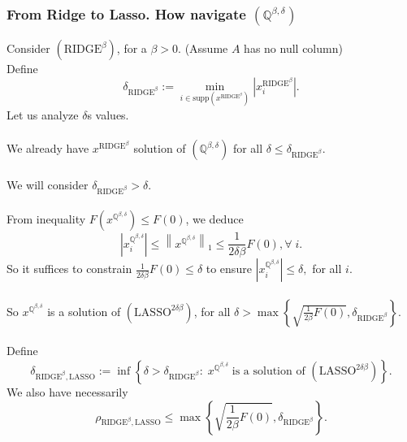 \documentclass[fleqn]{report} %
\newcommand\ddfrac[2]{\frac{\displaystyle #1}{\displaystyle #2}}
\begin{document}
\subsubsection{From Ridge to Lasso. How navigate $(\mathbb{Q}^{\beta,\delta})$}
Consider $(\text{RIDGE}^{\beta})$, for a $\beta>0$. (Assume $A$ has no null column)\\ Define 
\[
\delta_{\text{RIDGE}^{\beta}}:=\underset{i\in\text{supp}(x^{\text{RIDGE}^{\beta}})}{\min} \left|x^{\text{RIDGE}^{\beta}}_i\right|.
\]
Let us analyze $\delta$s values.\\
\\
We already have $x^{\text{RIDGE}^{\beta}}$ solution of  $(\mathbb{Q}^{\beta,\delta})$ for all $\delta\leq\delta_{\text{RIDGE}^{\beta}}$.\\\\
We will consider $\delta_{\text{RIDGE}^{\beta}} > \delta$.\\
\\
From inequality $F(x^{\mathbb{Q}^{\beta,\delta}}) \leq F(0)$, we deduce
\[
  \left|x^{\mathbb{Q}^{\beta,\delta}}_i\right|\leq\left\|x^{\mathbb{Q}^{\beta,\delta}}\right\|_{1}  \leq\ddfrac{1}{2\delta\beta}F(0),\forall\;i.
\]
So it suffices to constrain $\ddfrac{1}{2\delta\beta}F(0)\leq \delta$ to ensure $\left|x^{\mathbb{Q}^{\beta,\delta}}_i\right|\leq \delta,$ for all $i$.\\\\
So $x^{\mathbb{Q}^{\beta,\delta}}$ is a solution of $( \text{LASSO}^{2\delta\beta})$,  for all $\delta > \max\left\{\sqrt{\ddfrac{1}{2\beta}F(0)},  \delta_{\text{RIDGE}^{\beta}}\right\}$.\\
\\
Define 
\[
\delta_{\text{RIDGE}^{\beta},\text{LASSO}} :=\inf\left\{\delta  >  \delta_{\text{RIDGE}^{\beta}}:\;x^{\mathbb{Q}^{\beta,\delta}}\; \text{is a solution of }( \text{LASSO}^{2\delta\beta})\right\}.
\]
We also have necessarily  
\[\rho_{\text{RIDGE}^{\beta},\text{LASSO}}\leq\max\left\{\sqrt{\ddfrac{1}{2\beta}F(0)},  \delta_{\text{RIDGE}^{\beta}}\right\}.
\]
\end{document}

